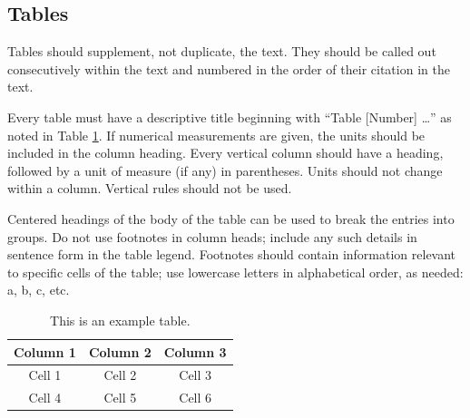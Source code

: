 \documentclass{article}
\begin{document}
\subsection*{Tables}
Tables should supplement, not duplicate, the text. They should be called out consecutively within the text and numbered in the order of their citation in the text. 

Every table must have a descriptive title beginning with ``Table [Number] …'' as noted in Table \ref{tab:1}. If numerical measurements are given, the units should be included in the column heading. Every vertical column should have a heading, followed by a unit of measure (if any) in parentheses. Units should not change within a column. Vertical rules should not be used. 

Centered headings of the body of the table can be used to break the entries into groups. Do not use footnotes in column heads; include any such details in sentence form in the table legend. Footnotes should contain information relevant to specific cells of the table; use lowercase letters in alphabetical order, as needed: a, b, c, etc.

\begin{table}[b]
    \caption{This is an example table.}    
    \centering
    \begin{tabular}{ccc}
            \hline
            Column 1 & Column 2 & Column 3 \\  
            \hline
            Cell 1 & Cell 2 & Cell 3\\ 
            Cell 4 & Cell 5 & Cell 6 \\
            \hline
            \end{tabular}

    \label{tab:1}
\end{table}
\end{document}

